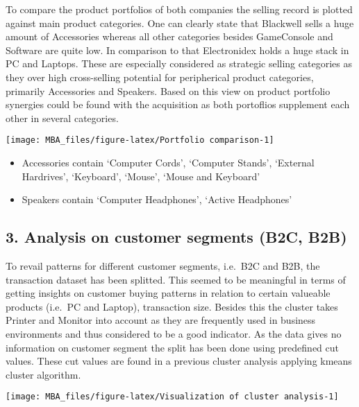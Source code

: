 \documentclass[]{article}
\providecommand{\tightlist}{%
  \setlength{\itemsep}{0pt}\setlength{\parskip}{0pt}}
\begin{document}
To compare the product portfolios of both companies the selling record
is plotted against main product categories. One can clearly state that
Blackwell sells a huge amount of Accessories whereas all other
categories besides GameConsole and Software are quite low. In comparison
to that Electronidex holds a huge stack in PC and Laptops. These are
especially considered as strategic selling categories as they over high
cross-selling potential for peripherical product categories, primarily
Accessories and Speakers. Based on this view on product portfolio
synergies could be found with the acquisition as both portoflios
supplement each other in several categories.

\begin{center}\texttt{[image: MBA\_files/figure-latex/Portfolio comparison-1]} \end{center}

\begin{itemize}
\tightlist
\item
  Accessories contain `Computer Cords', `Computer Stands', `External
  Hardrives', `Keyboard', `Mouse', `Mouse and Keyboard'\\
\item
  Speakers contain `Computer Headphones', `Active Headphones'
\end{itemize}

\hypertarget{analysis-on-customer-segments-b2c-b2b}{%
\subsection{3. Analysis on customer segments (B2C,
B2B)}\label{analysis-on-customer-segments-b2c-b2b}}

To revail patterns for different customer segments, i.e.~B2C and B2B,
the transaction dataset has been splitted. This seemed to be meaningful
in terms of getting insights on customer buying patterns in relation to
certain valueable products (i.e.~PC and Laptop), transaction size.
Besides this the cluster takes Printer and Monitor into account as they
are frequently used in business environments and thus considered to be a
good indicator. As the data gives no information on customer segment the
split has been done using predefined cut values. These cut values are
found in a previous cluster analysis applying kmeans cluster algorithm.

\begin{center}\texttt{[image: MBA\_files/figure-latex/Visualization of cluster analysis-1]} \end{center}
\end{document}
